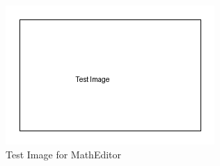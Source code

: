\begin{figure}[htbp]
    \centering
    \includegraphics{image_7216bf35.png}
    \caption{Test Image for MathEditor}
    \label{fig:math_editor_test}
\end{figure}

